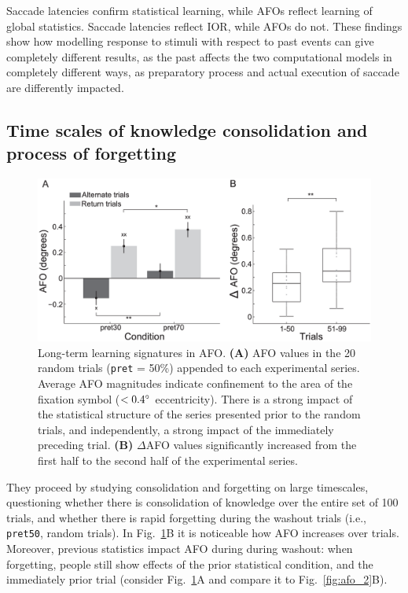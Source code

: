 Saccade latencies confirm statistical learning, while AFOs reflect learning of global statistics. Saccade latencies reflect IOR, while AFOs do not. 
These findings show how modelling response to stimuli with respect to past events can give completely different results, as the past affects the two computational models in completely different ways, as preparatory process and actual execution of saccade are differently impacted.

\subsection{Time scales of knowledge consolidation and process of forgetting}

\begin{figure}[!ht]
    \centering
    \captionsetup{width=.8\linewidth}
    \includegraphics[width=0.55\linewidth]{images/afo_3.png}
    \caption{Long-term learning signatures in AFO. \textbf{(A)} AFO values in the 20 random trials (\texttt{pret} = 50\%) appended to each experimental series. Average AFO magnitudes indicate confinement to the area of the fixation symbol ($<0.4\degree$ eccentricity). There is a strong impact of the statistical structure of the series presented prior to the random trials, and independently, a strong impact of the immediately preceding trial. \textbf{(B)} $\Delta$AFO values significantly increased from the first half to the second half of the experimental series.}
    \label{fig:afo_3}
\end{figure}

They proceed by studying consolidation and forgetting on large timescales, questioning whether there is consolidation of knowledge over the entire set of 100 trials, and whether there is rapid forgetting during the washout trials (i.e., \texttt{pret50}, random trials). In Fig.~\ref{fig:afo_3}B it is noticeable how AFO increases over trials.
Moreover, previous statistics impact AFO during during washout: when forgetting, people still show effects of the prior statistical condition, and the immediately prior trial (consider Fig.~\ref{fig:afo_3}A and compare it to Fig.~\ref{fig:afo_2}B).

